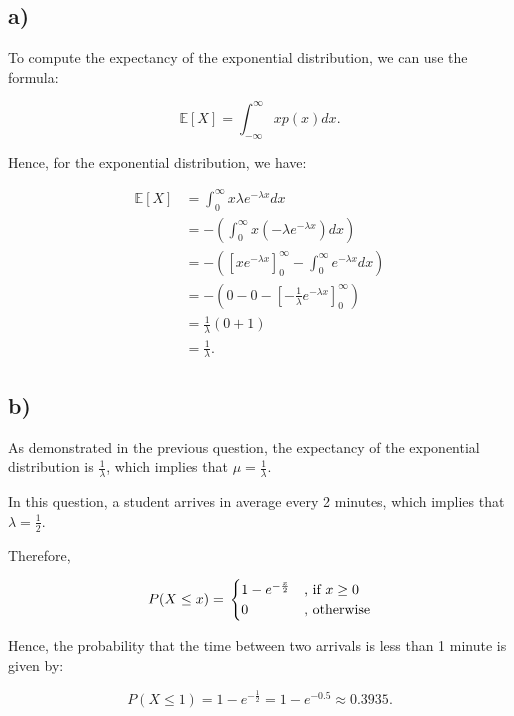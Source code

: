 \documentclass[12pt,a4paper,oneside]{paper}
\begin{document}
\subsection*{a)}

To compute the expectancy of the exponential distribution, we can use the formula:

\[
\mathbb{E}[X] = \int_{-\infty}^{\infty} x p(x) dx.
\]

Hence, for the exponential distribution, we have:

\begin{align*}
\mathbb{E}[X] &= \int_{0}^{\infty} x \lambda e^{-\lambda x} dx \\
&= - \left( \int_{0}^{\infty} x (- \lambda e^{-\lambda x}) dx \right) \\
&= - \left( \left[ x e^{-\lambda x} \right]_{0}^{\infty} - \int_{0}^{\infty} e^{-\lambda x} dx \right) \\
&= - \left( 0 - 0 - \left[ - \frac{1}{\lambda} e^{-\lambda x} \right]_{0}^{\infty} \right) \\
&= \frac{1}{\lambda} \left( 0 + 1 \right) \\
&= \frac{1}{\lambda}.
\end{align*}

\newpage
\subsection*{b)}

As demonstrated in the previous question, the expectancy of the exponential distribution is \( \frac{1}{\lambda} \), which implies that
$\mu = \frac{1}{\lambda}$.

In this question, a student arrives in average every 2 minutes, which implies that \( \lambda = \frac{1}{2} \).

Therefore, 

\begin{equation}
P(X \leq x) = \\
\begin{cases}
1 - e^{-\frac{x}{2}} & \text{, if } x \geq 0 \\
0 & \text{, otherwise}
\end{cases}
\end{equation}

Hence, the probability that the time between two arrivals is less than 1 minute is given by:

\[
P(X \leq 1) = 1 - e^{-\frac{1}{2}} = 1 - e^{-0.5} \approx 0.3935.
\]

\newpage
\end{document}
